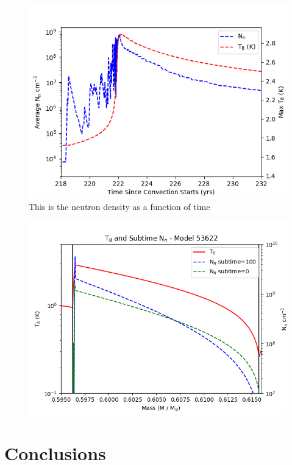 \documentclass[fleqn,usenatbib]{mnras}
\begin{document}
\begin{figure}
  \includegraphics[width=\columnwidth]{figs/Neutron_Density_Time.png}
  \caption{This is the neutron density as a function of time} 
\end{figure}

\begin{figure}
   \includegraphics[width=1\columnwidth]{figs/T_Neutron_sub.png}
\end{figure}


\section{Conclusions}
\end{document}
